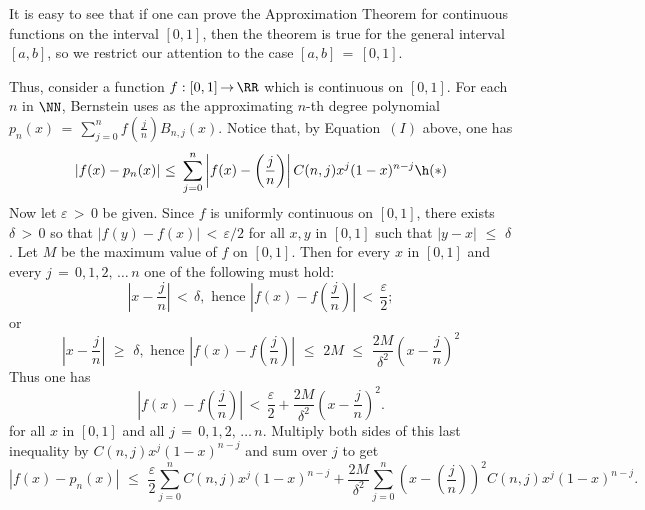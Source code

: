 \V

        It is easy to see that if one can prove the Approximation Theorem for continuous functions on the interval $[0,1]$,
    then the theorem is true for the general interval $[a,b]$, so we restrict our attention to the case $[a,b] \,=\, [0,1]$.

        Thus, consider a function $f:[0,1] \,{\rightarrow}\, {\RR}$ which is continuous on $[0,1]$.
    For each $n$ in ${\NN}$, Bernstein uses as the approximating $n$-th degree polynomial ${\displaystyle p_{n}(x) \,=\, \sum_{j=0}^{n} f\left(\frac{j}{n}\right)B_{n,j}(x)}$.
    Notice that, by Equation~$(I)$ above, one has
        \begin{displaymath}
        |f(x)-p_{n}(x)|\,\,{\leq}\,\,\sum_{j=0}^{n} \left|f(x) - \left(\frac{j}{n}\right)\right|C(n,j)x^{j}(1-x)^{n-j} \h ({\ast})
        \end{displaymath}
    Now let ${\varepsilon}\,>\,0$ be given. Since $f$ is uniformly continuous on $[0,1]$,
    there exists ${\delta}\,>\,0$ so that $|f(y)-f(x)|\,<\,{\varepsilon}/2$ for all $x,y$ in $[0,1]$ such that $|y-x|\,\,{\leq}\,\,{\delta}$.
    Let $M$ be the maximum value of $f$ on $[0,1]$. Then for every $x$ in $[0,1]$ and every $j \,=\, 0,1,2,\,{\ldots}\,n$ one of the following must hold:
        \begin{displaymath}
        \left|x-\frac{j}{n}\right|\,<\,{\delta}, \mbox{ hence }
        \left|f(x) - f\left(\frac{j}{n}\right)\right|\,<\,\frac{{\varepsilon}}{2};
        \end{displaymath}
    or
        \begin{displaymath}
        \left|x-\frac{j}{n}\right|\,\,{\geq}\,\,{\delta}, \mbox{ hence }
   \left|f(x) - f\left(\frac{j}{n}\right)\right|\,\,{\leq}\,\,2M\,\,{\leq}\,\,
    \frac{2M}{{\delta}^{2}}\left(x- \frac{j}{n}\right)^{2}
        \end{displaymath}
    Thus one has
        \begin{displaymath}
        \left|f(x) - f\left(\frac{j}{n}\right)\right|\,<\,\frac{{\varepsilon}}{2} + \frac{2M}{{\delta}^{2}}\left(x- \frac{j}{n}\right)^{2}.
        \end{displaymath}
    for all $x$ in $[0,1]$ and all $j \,=\, 0,1,2,\,{\ldots}\,n$.
    Multiply both sides of this last inequality by $C(n,j)x^{j}(1-x)^{n-j}$ and sum over $j$ to get
        \begin{displaymath}
        |f(x) - p_{n}(x)|\,\,{\leq}\,\,
    \frac{{\varepsilon}}{2}\sum_{j=0}^{n} C(n,j)x^{j}(1-x)^{n-j} + \frac{2M}{{\delta}^{2}}\sum_{j=0}^{n} \left(x- \left(\frac{j}{n}\right)\right)^{2}C(n,j)x^{j}(1-x)^{n-j}.
        \end{displaymath}
